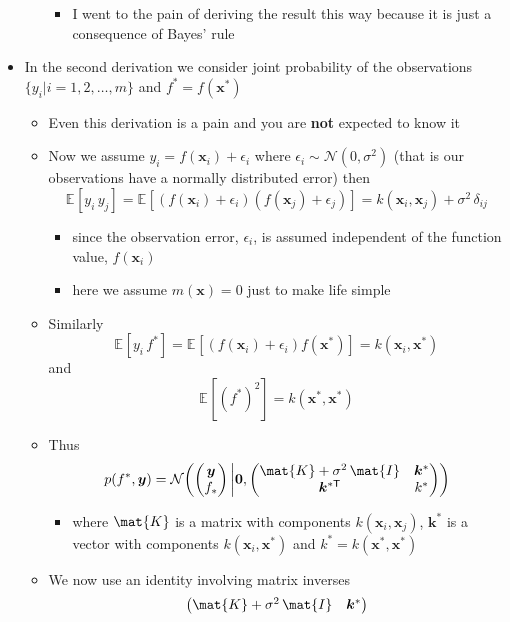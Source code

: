 \documentclass[11pt]{article}
\newcommand{\tr}{\textsf{T}}
\newcommand{\av}[2][]{\mathbb{E}_{#1\!}\left[ #2 \right]}
\begin{document}
\begin{itemize}
\begin{itemize}
\begin{itemize}
\item I went to the pain of deriving the result this way because it
is just a consequence of Bayes' rule
\end{itemize}
\end{itemize}
\item In the second derivation we consider joint probability of the
observations \(\{y_i| i=1,2,\ldots,m\}\) and \(f^*=f(\bm{x}^*)\)
\begin{itemize}
\item Even this derivation is a pain and you are \textbf{not} expected to
know it
\item Now we assume \(y_i = f(\bm{x}_i) + \epsilon_i\) where
\(\epsilon_i\sim \mathcal{N}(0,\sigma^2)\) (that is our
observations have a normally distributed error) then
$$ \av{y_i \, y_j} =  \av{(f(\bm{x}_i) +
       \epsilon_i)(f(\bm{x}_j) + \epsilon_j)} =
       k(\bm{x}_i,\bm{x}_j) + \sigma^2 \,\delta_{ij} $$
\begin{itemize}
\item since the observation error, \(\epsilon_i\), is assumed independent of the
function value, \(f(\bm{x}_i)\)
\item here we assume \(m(\bm{x})=0\) just to make life simple
\end{itemize}
\item Similarly
$$ \av{y_i\,f^*} =  \av{(f(\bm{x}_i) + \epsilon_i) f(\bm{x}^*)} 
       = k(\bm{x}_i,\bm{x}^*) $$
and
$$ \av{(f^*)^2} = k(\bm{x}^*,\bm{x}^*) $$
\item Thus
$$ p(f^*, \bm{y}) = \mathcal{N}\!\left( \begin{pmatrix}  \bm{y}  \\ f_*  \end{pmatrix}
        \bigg \vert \bm{0} ,
        \begin{pmatrix}
        \mat{K} + \sigma^2 \, \mat{I} & \bm{k}^* \\
         \bm{k}^{*\tr} & k^*
        \end{pmatrix}\right) $$
\begin{itemize}
\item where \(\mat{K}\) is a matrix with components
\(k(\bm{x}_i,\bm{x}_j)\), \(\bm{k}^*\) is a vector with
components \(k(\bm{x}_i,\bm{x}^*)\) and \(k^*=k(\bm{x}^*,\bm{x}^*)\)
\end{itemize}
\item We now use an identity involving matrix inverses
$$  \begin{pmatrix}
        \mat{K} + \sigma^2 \, \mat{I} & \bm{k}^* \\

\end{pmatrix}$$
\end{itemize}
\end{itemize}
\end{document}
